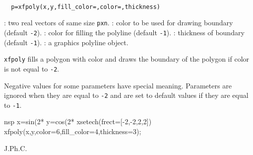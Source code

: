 \begin{mandesc}
  \\
\end{mandesc}
\begin{calling_sequence}
\begin{verbatim}
  p=xfpoly(x,y,fill_color=,color=,thickness)
\end{verbatim}
\end{calling_sequence}
\begin{parameters}
  \begin{varlist}
    : two real vectors of same size \verb!pxn!.
    : color to be used for drawing boundary (default \verb!-2!).
    : color for filling the polyline (default \verb!-1!).
    : thickness of boundary (default \verb!-1!).
    : a graphics polyline object.
  \end{varlist}
\end{parameters}

\begin{mandescription}
  \verb!xfpoly! fills a polygon with color and draws the boundary of
  the polygon if color is not equal to \verb!-2!.

  Negative values for some parameters have special meaning.
  Parameters are ignored when they are equal to \verb!-2!
  and are set to default values if they are equal to \verb!-1!.
\end{mandescription}

\begin{examples}
  \begin{mintednsp}{nsp}
    x=sin(2*%
    y=cos(2*%
    xsetech(frect=[-2,-2,2,2])
    xfpoly(x,y,color=6,fill_color=4,thickness=3);
  \end{mintednsp}
\end{examples}

\begin{manseealso}
    
\end{manseealso}


\begin{authors}
  J.Ph.C.

\end{authors}
